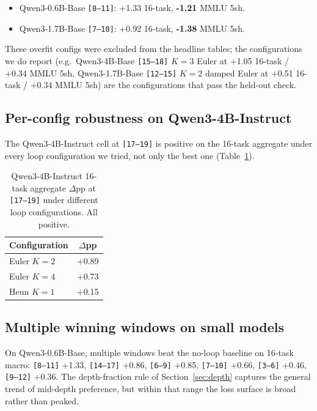 \begin{itemize}
\item Qwen3-0.6B-Base \texttt{[8--11]}: +1.33 16-task,
      \textbf{-1.21} MMLU 5sh.
\item Qwen3-1.7B-Base \texttt{[7--10]}: +0.92 16-task,
      \textbf{-1.38} MMLU 5sh.
\end{itemize}

These overfit configs were excluded from the headline tables; the configurations we do report (e.g.\ Qwen3-4B-Base \texttt{[15--18]} $K{=}3$ Euler at +1.05 16-task / +0.34 MMLU 5sh, Qwen3-1.7B-Base \texttt{[12--15]} $K{=}2$ damped Euler at +0.51 16-task / +0.34 MMLU 5sh)
are the configurations that pass the held-out check.

\subsection{Per-config robustness on Qwen3-4B-Instruct}

The Qwen3-4B-Instruct cell at \texttt{[17--19]} is positive on the 16-task aggregate under every loop configuration we tried, not only the best one (Table~\ref{tab:robustness-config}). 

\begin{table}[h]
\centering
\footnotesize
\caption{Qwen3-4B-Instruct 16-task aggregate $\Delta$pp at
\texttt{[17--19]} under different loop configurations. All positive.}
\label{tab:robustness-config}
\setlength{\tabcolsep}{8pt}
\begin{tabular}{lc}
\toprule
Configuration & $\Delta$pp \\
\midrule
Euler $K{=}2$  & +0.89 \\
Euler $K{=}4$  & +0.73 \\
Heun  $K{=}1$  & +0.15 \\
\bottomrule
\end{tabular}
\end{table}

\subsection{Multiple winning windows on small models}

On Qwen3-0.6B-Base, multiple windows beat the no-loop baseline on 16-task macro: \texttt{[8--11]} +1.33, \texttt{[14--17]} +0.86, \texttt{[6--9]} +0.85, \texttt{[7--10]} +0.66, \texttt{[3--6]} +0.46, \texttt{[9--12]} +0.36. The depth-fraction rule of Section~\ref{sec:depth} captures the general trend of mid-depth preference, but within that range the loss surface is broad rather than peaked.

